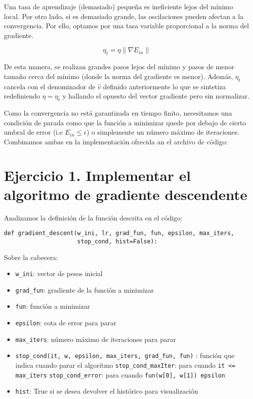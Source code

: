 Una tasa de aprendizaje (demasiado) pequeña es ineficiente lejos del mínimo local. 
Por otro lado, si es demasiado grande, las oscilaciones pueden afectan a la convergencia.
Por ello, optamos por una tasa variable proporcional a la norma del gradiente.

\begin{equation*}
  \eta_t = \eta \lVert \nabla E_{in} \rVert
\end{equation*}

De esta manera, se realizan grandes pasos lejos del mínimo y pasos de menor tamaño
cerca del mínimo (donde la norma del gradiente es menor).
Además, $\eta_t$ cancela con el denominador de $\hat{v}$ definido anteriormente lo que
se sintetiza redefiniendo $\eta = \eta_t$ y hallando el opuesto del vector gradiente 
pero sin normalizar.

Como la convergencia no está garantizada en tiempo finito, necesitamos una condición de
parada como que la función a minimizar quede por debajo de cierto umbral de
error (i.e $E_{in} \leq \epsilon$) o simplemente un número máximo de iteraciones.
Combinamos ambas en la implementación ofrecida an el archivo de código:

\section{Ejercicio 1. Implementar el algoritmo de gradiente descendente}

Analizamos la definición de la función descrita en el código:

\begin{verbatim}
def gradient_descent(w_ini, lr, grad_fun, fun, epsilon, max_iters,
                     stop_cond, hist=False):
\end{verbatim}

Sobre la cabecera:
\begin{itemize}
  \item \texttt{w_ini}: vector de pesos inicial
  \item \texttt{grad_fun}: gradiente de la función a minimizar
  \item \texttt{fun}: función a minimizar
  \item \texttt{epsilon}: cota de error para parar 
  \item \texttt{max_iters}: número máximo de iteraciones para parar
  \item \texttt{stop_cond(it, w, epsilon, max_iters, grad_fun, fun)}
    : función que indica cuando parar el algoritmo
    \subitem \texttt{stop_cond_maxIter}: para cuando \texttt{it <= max_iters}
    \subitem \texttt{stop_cond_error}: para cuando \texttt{fun(w[0], w[1]) \leq epsilon}
  \item \texttt{hist}: True si se desea devolver el histórico para visualización
\end{itemize}


